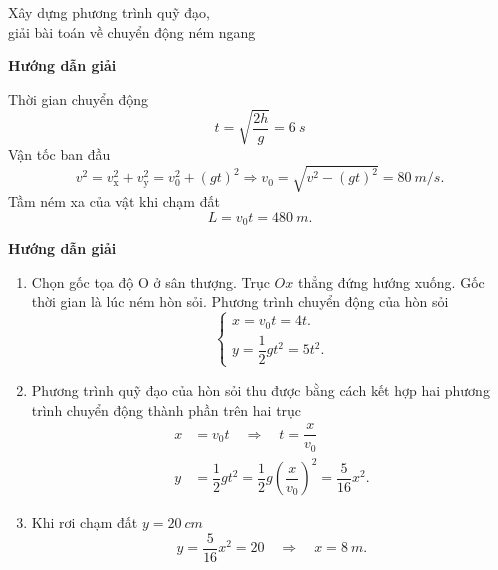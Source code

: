 \begin{dang}{Xây dựng phương trình quỹ đạo, \\giải bài toán về chuyển động ném ngang}
	{	\begin{center}
			\textbf{Hướng dẫn giải}
		\end{center}
		
		Thời gian chuyển động
			\begin{equation*}
				t=\sqrt{\dfrac{2h}{g}} = \SI{6}{s}
			\end{equation*}
		Vận tốc ban đầu 
			\begin{equation*}
				v^2 = v^2_{\text{x}} + v^2_{\text{y}}  = v^2_0+ (gt)^2 \Rightarrow v_0 =\sqrt{ v^2 -(gt)^2} = \SI{80}{m/s}.  
			\end{equation*}
		Tầm ném xa của vật khi chạm đất
			\begin{equation*}
				L=v_0 t  = \SI{480}{m}.
			\end{equation*}

	}
	{	\begin{center}
			\textbf{Hướng dẫn giải}
		\end{center}
		\begin{enumerate}[label=\alph*.]
			\item Chọn gốc tọa độ O ở sân thượng. Trục $Ox$ thẳng đứng hướng xuống. Gốc thời gian là lúc ném hòn sỏi. Phương trình chuyển động của hòn sỏi
			\begin{equation*}
				\begin{cases}
					x =v_0t = 4t. \\
					y = \dfrac{1}{2}gt^2 =5t^2.
				\end{cases}
			\end{equation*}
			\item Phương trình quỹ đạo của hòn sỏi thu được bằng cách kết hợp hai phương trình chuyển động thành phần trên hai trục
				\begin{align*}
					x&=v_0t	\quad\Rightarrow\quad t=\dfrac{x}{v_0}\\
					y&=\dfrac{1}{2}gt^{2}=\dfrac{1}{2}g\left(\dfrac{x}{v_0}\right)^{2}= \dfrac{5}{16}x^2.
				\end{align*}
			\item Khi rơi chạm đất $y = \SI{20}{cm}$
				$$y=\dfrac{5}{16}x^2 =20 \quad\Rightarrow\quad x = \SI{8}{m}.$$
			

\end{enumerate}}
\end{dang}
